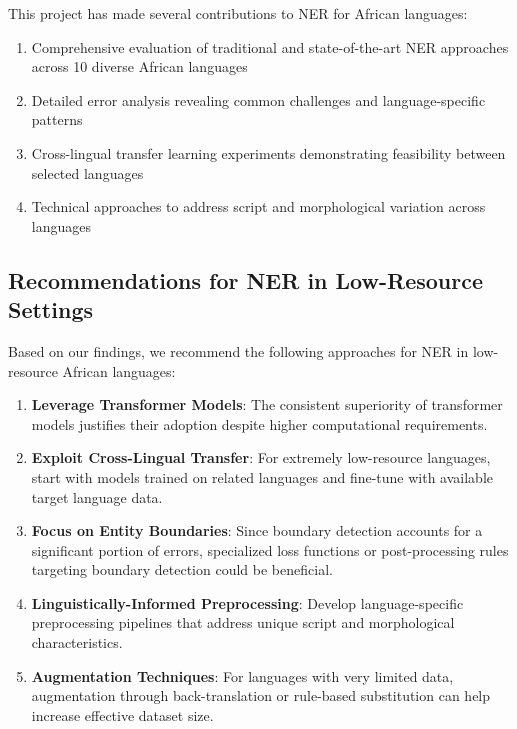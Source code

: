 \documentclass[
]{article}
\providecommand{\tightlist}{%
  \setlength{\itemsep}{0pt}\setlength{\parskip}{0pt}}\usepackage{longtable,booktabs,array}
\begin{document}
This project has made several contributions to NER for African
languages:

\begin{enumerate}
\def\labelenumi{\arabic{enumi}.}
\tightlist
\item
  Comprehensive evaluation of traditional and state-of-the-art NER
  approaches across 10 diverse African languages
\item
  Detailed error analysis revealing common challenges and
  language-specific patterns
\item
  Cross-lingual transfer learning experiments demonstrating feasibility
  between selected languages
\item
  Technical approaches to address script and morphological variation
  across languages
\end{enumerate}

\subsection{Recommendations for NER in Low-Resource
Settings}\label{recommendations-for-ner-in-low-resource-settings}

Based on our findings, we recommend the following approaches for NER in
low-resource African languages:

\begin{enumerate}
\def\labelenumi{\arabic{enumi}.}
\item
  \textbf{Leverage Transformer Models}: The consistent superiority of
  transformer models justifies their adoption despite higher
  computational requirements.
\item
  \textbf{Exploit Cross-Lingual Transfer}: For extremely low-resource
  languages, start with models trained on related languages and
  fine-tune with available target language data.
\item
  \textbf{Focus on Entity Boundaries}: Since boundary detection accounts
  for a significant portion of errors, specialized loss functions or
  post-processing rules targeting boundary detection could be
  beneficial.
\item
  \textbf{Linguistically-Informed Preprocessing}: Develop
  language-specific preprocessing pipelines that address unique script
  and morphological characteristics.
\item
  \textbf{Augmentation Techniques}: For languages with very limited
  data, augmentation through back-translation or rule-based substitution
  can help increase effective dataset size.
\end{enumerate}
\end{document}
